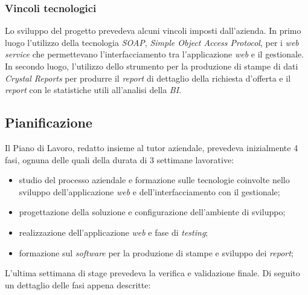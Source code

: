 \subsubsection{Vincoli tecnologici}
Lo sviluppo del progetto prevedeva alcuni vincoli imposti dall'azienda.
In primo luogo l'utilizzo della tecnologia \textit{SOAP}, \textit{Simple Object Access Protocol}, per i \textit{web service} che permettevano l'interfacciamento tra l'applicazione \textit{web} e il gestionale.
In secondo luogo, l'utilizzo dello strumento per la produzione di stampe di dati \textit{Crystal Reports} per produrre il \textit{report} di dettaglio della richiesta d'offerta e il \textit{report} con le statistiche utili all'analisi della \textit{BI}.


\subsection{Pianificazione}

Il Piano di Lavoro, redatto insieme al tutor aziendale, prevedeva inizialmente 4 fasi, ognuna delle quali della durata di 3 settimane lavorative:
\begin{itemize}
	\item studio del processo aziendale e formazione sulle tecnologie coinvolte nello sviluppo dell'applicazione \textit{web} e dell'interfacciamento con il gestionale;
	\item progettazione della soluzione e configurazione dell'ambiente di sviluppo;
	\item realizzazione dell'applicazione \textit{web} e fase di \textit{testing};
	\item formazione sul \textit{software} per la produzione di stampe e sviluppo dei \textit{report};
\end{itemize}
L'ultima settimana di stage prevedeva la verifica e validazione finale.
Di seguito un dettaglio delle fasi appena descritte:

